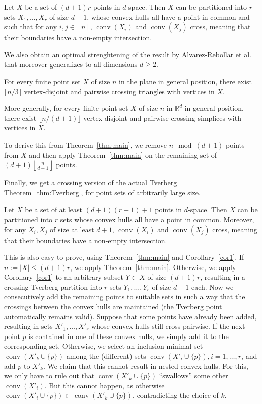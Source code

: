 \documentclass[english,a4paper,nolineno]{lipics-v2019}
\newcommand{\conv}{\mathop{\mathrm{conv}}}
\begin{document}
\begin{corollary}\label{cor1} Let $X$ be a set of $(d+1)r$ points in $d$-space. Then $X$ can be partitioned into $r$ sets $X_1,\ldots, X_r$ of size $d+1$, whose convex hulls all have a point in common and such that for any $i,j\in [n]$, $\conv (X_i)$ and $\conv (X_j)$ cross, meaning that their boundaries have a non-empty intersection.  
\end{corollary}

We also obtain an optimal strenghtening of the result by Alvarez-Rebollar et al.~\cite{RLU2016_crossingFam} that moreover generalizes to all dimensions $d\geq 2$.

\begin{corollary}
For every finite point set $X$ of size $n$ in the plane in general position, there exist $\lfloor n/3\rfloor$ vertex-disjoint and pairwise crossing triangles with vertices in $X$.

More generally, for every finite point set $X$ of size $n$ in $\mathbb R^d$ in general position, there exist $\lfloor n/(d+1)\rfloor$ vertex-disjoint and pairwise crossing simplices with vertices in $X$.
\end{corollary}
To derive this from Theorem~\ref{thm:main}, we remove $n\mod (d+1)$ points from $X$ and then apply Theorem~\ref{thm:main} on the remaining set of $(d+1)\left\lfloor\frac{n}{d+1}\right\rfloor$ points.

Finally, we get a crossing version of the actual Tverberg Theorem~\ref{thm:Tverberg}, for point sets of arbitrarily large size.

\begin{theorem}\label{thm:crossing_tverberg}
Let $X$ be a set of at least $(d+1)(r-1)+1$ points in $d$-space. Then $X$ can be partitioned into $r$ sets whose convex hulls all have a point in common. Moreover, for any $X_i,X_j$ of size at least $d+1$, $\conv (X_i)$ and $\conv (X_j)$ cross, meaning that their boundaries have a non-empty intersection.  
\end{theorem} 

This is also easy to prove, using Theorem~\ref{thm:main} and Corollary~\ref{cor1}. If $n:=|X|\leq (d+1)r$, we apply Theorem~\ref{thm:main}. Otherwise, we apply Corollary~\ref{cor1} to an arbitrary subset $Y\subset X$ of size $(d+1)r$, resulting in a crossing Tverberg partition into $r$ sets $Y_1,\ldots,Y_r$ of size $d+1$ each. Now we consecutively add the remaining points to suitable sets in such a way that the crossings between the convex hulls are maintained (the Tverberg point automatically remains valid). Suppose that some points have already been added, resulting in sets $X'_1,\ldots,X'_r$ whose convex hulls still cross pairwise. If the next point $p$ is contained in one of these convex hulls, we simply add it to the corresponding set. Otherwise, we select an inclusion-minimal set $\conv(X'_k\cup\{p\})$ among the (different) sets $\conv(X'_i\cup\{p\}), i=1,\ldots,r$, and add $p$ to $X'_k$.  We claim that this cannot result in nested convex hulls. For this, we only have to rule out that $\conv(X'_k\cup\{p\})$ ``swallows'' some other $\conv(X'_i)$. But this cannot happen, as otherwise $\conv(X'_i\cup\{p\})\subset \conv(X'_k\cup\{p\})$, contradicting the choice of $k$.
\end{document}
